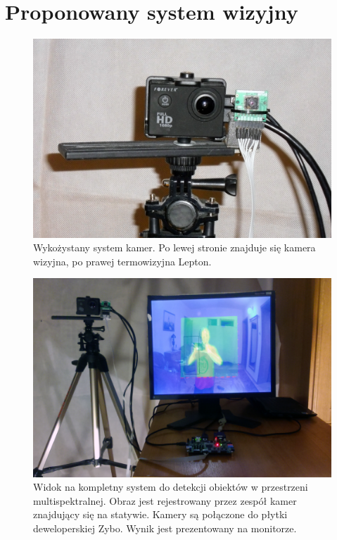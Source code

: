 \chapter{Proponowany system wizyjny}
\label{cha:propSysWiz}


\begin{figure}
\centering
\includegraphics[width=0.65\linewidth]{images/kameraRGBIR.jpg}
\caption[Wykożystany system kamer.]{Wykożystany system kamer. Po lewej stronie znajduje się kamera wizyjna, po prawej termowizyjna Lepton.}
\label{fig:kameraRGBIR}
\end{figure}

\begin{figure}
\centering
\includegraphics[width=0.65\linewidth]{images/systemOverview.jpg}
\caption[Widok na kompletny system.]{Widok na kompletny system do detekcji obiektów w przestrzeni multispektralnej. Obraz jest rejestrowany przez zespół kamer znajdujący się na statywie. Kamery są połączone do płytki deweloperskiej Zybo. Wynik jest prezentowany na monitorze.}
\label{fig:systemOverview}
\end{figure}



